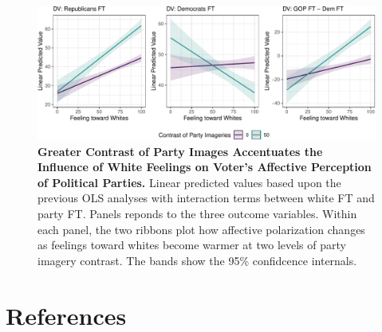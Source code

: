 \documentclass[
  12pt,
]{article}
\begin{document}
\begin{figure}[tb]

{\centering \includegraphics{local-images_files/figure-pdf/fig-mechanism-1.pdf}

}

\caption{\label{fig-mechanism}\textbf{Greater Contrast of Party Images
Accentuates the Influence of White Feelings on Voter's Affective
Perception of Political Parties.} Linear predicted values based upon the
previous OLS analyses with interaction terms between white FT and party
FT. Panels reponds to the three outcome variables. Within each panel,
the two ribbons plot how affective polarization changes as feelings
toward whites become warmer at two levels of party imagery contrast. The
bands show the 95\% confidcence internals.}

\end{figure}

\small

\hypertarget{references}{%
\section*{References}\label{references}}
\end{document}
